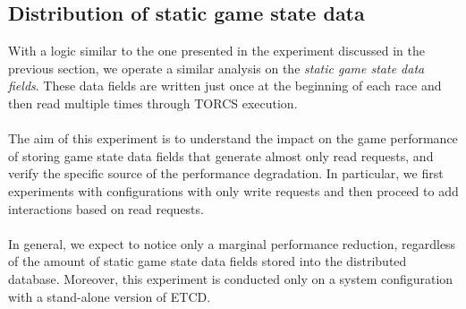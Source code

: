 \subsection{Distribution of static game state data}
With a logic similar to the one presented in the experiment discussed in the previous section, we operate a similar analysis on the \textit{static game state data fields}. These data fields are written just once at the beginning of each race and then read multiple times through TORCS execution. \\ \\
The aim of this experiment is to understand the impact on the game performance of storing game state data fields that generate almost only read requests, and verify the specific source of the performance degradation. In particular, we first experiments with configurations with only write requests and then proceed to add interactions based on read requests. \\ \\
In general, we expect to notice only a marginal performance reduction, regardless of the amount of static game state data fields stored into the distributed database. Moreover, this experiment is conducted only on a system configuration with a stand-alone version of ETCD.

